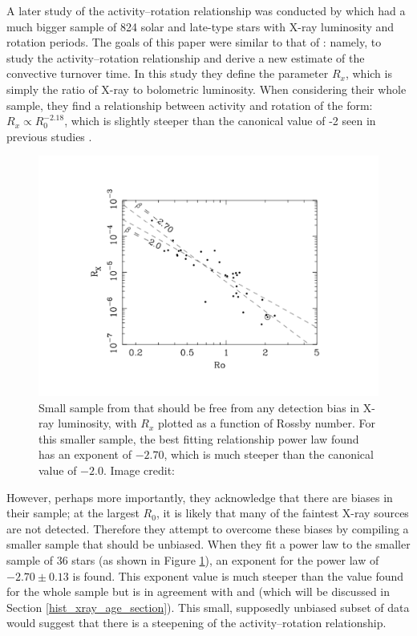 A later study of the activity--rotation relationship was conducted by \citet{Wright_etal_2011} which had a much bigger sample of 824 solar and late-type stars with X-ray luminosity and rotation periods. The goals of this paper were similar to that of \citet{Pizzolato_etal_2003}: namely, to study the activity--rotation relationship and derive a new estimate of the convective turnover time. In this study they define the parameter $R_{x}$, which is simply the ratio of X-ray to bolometric luminosity. When considering their whole sample, they find a relationship between activity and rotation of the form: $R_{x} \propto R_{0}^{-2.18}$, which is slightly steeper than the canonical value of -2 seen in previous studies \citep{Pallavicini_etal_1981,Pizzolato_etal_2003}.

\begin{figure}[h]
    \centering
    \includegraphics[scale=0.55]{Figures/2-Historical_overview/wright_etal_fig_3.pdf}
    \caption[Activity--rotation relationship for small, unbiased subset of \citet{Wright_etal_2011} data]{Small sample from \citet{Wright_etal_2011} that should be free from any detection bias in X-ray luminosity, with $R_{x}$ plotted as a function of Rossby number. For this smaller sample, the best fitting relationship power law found has an exponent of $-2.70$, which is much steeper than the canonical value of $-2.0$. Image credit: \citet{Wright_etal_2011}}
    \label{fig:wright_etal_2011_plot}
\end{figure}

However, perhaps more importantly, they acknowledge that there are biases in their sample; at the largest $R_{0}$, it is likely that many of the faintest X-ray sources are not detected. Therefore they attempt to overcome these biases by compiling a smaller sample that should be unbiased. When they fit a power law to the smaller sample of 36 stars (as shown in Figure \ref{fig:wright_etal_2011_plot}), an exponent for the power law of $-2.70 \pm 0.13$ is found. This exponent value is much steeper than the value found for the whole sample but is in agreement with \citet{Gudel_etal_1997} and \citet{Feigelson_etal_2004} (which will be discussed in Section \ref{hist_xray_age_section}). This small, supposedly unbiased subset of data would suggest that there is a steepening of the activity--rotation relationship.

